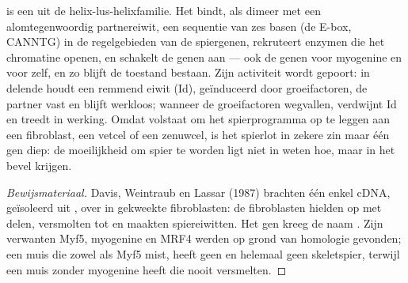 \begin{proposition}\label{prop:b2:cell-differentiation:myod}
 is een  uit de helix-lus-helixfamilie. Het bindt,
als dimeer met een alomtegenwoordig partnereiwit, een sequentie van zes
basen (de E-box, CANNTG) in de regelgebieden van de spiergenen, rekruteert
enzymen die het chromatine openen, en schakelt de genen aan --- ook de
genen voor myogenine en voor  zelf, en zo blijft de toestand bestaan.
Zijn activiteit wordt gepoort: in delende  houdt een remmend eiwit
(Id), geïnduceerd door groeifactoren, de partner vast en blijft 
werkloos; wanneer de groeifactoren wegvallen, verdwijnt Id en treedt 
in werking. Omdat  volstaat om het spierprogramma op te leggen aan een
fibroblast, een vetcel of een zenuwcel, is het spierlot in zekere zin maar
één gen diep: de moeilijkheid om spier te worden ligt niet in weten hoe,
maar in het bevel krijgen.
\end{proposition}
\begin{proof}[Bewijsmateriaal]
Davis, Weintraub en Lassar (1987) brachten één enkel cDNA, geïsoleerd uit
, over in gekweekte fibroblasten: de fibroblasten hielden op met
delen, versmolten tot  en maakten spiereiwitten. Het gen kreeg de
naam . Zijn verwanten Myf5, myogenine en MRF4 werden op grond van
homologie gevonden; een muis die zowel  als Myf5 mist, heeft geen
 en helemaal geen skeletspier, terwijl een muis zonder myogenine
 heeft die nooit versmelten.
\end{proof}

